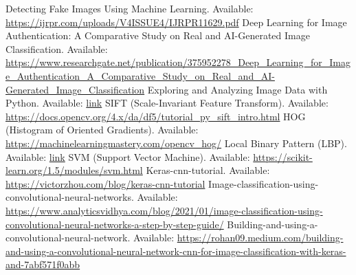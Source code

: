 \documentclass[10pt,twocolumn,letterpaper]{article}
\begin{document}
\begin{thebibliography}{6}
     Detecting Fake Images Using Machine Learning. Available: \url{https://ijrpr.com/uploads/V4ISSUE4/IJRPR11629.pdf}
     Deep Learning for Image Authentication: A Comparative Study on Real and AI-Generated Image Classification. Available: \url{https://www.researchgate.net/publication/375952278_Deep_Learning_for_Image_Authentication_A_Comparative_Study_on_Real_and_AI-Generated_Image_Classification}
     Exploring and Analyzing Image Data with Python. Available: \href{https://medium.com/@sehjadkhoja0/title-exploring-and-analyzing-image-data-with-python-79a7f72f4d2b}{link}
     SIFT (Scale-Invariant Feature Transform). Available: \url{https://docs.opencv.org/4.x/da/df5/tutorial_py_sift_intro.html}
     HOG (Histogram of Oriented Gradients). Available: \url{https://machinelearningmastery.com/opencv_hog/}
     Local Binary Pattern (LBP). Available: \href{https://aihalapathirana.medium.com/understanding-the-local-binary-pattern-lbp-a-powerful-method-for-texture-analysis-in-computer-4fb55b3ed8b8}{link}
     SVM (Support Vector Machine). Available: \url{https://scikit-learn.org/1.5/modules/svm.html}
     Keras-cnn-tutorial. Available: \url{https://victorzhou.com/blog/keras-cnn-tutorial}
     Image-classification-using-convolutional-neural-networks. Available: \url{https://www.analyticsvidhya.com/blog/2021/01/image-classification-using-convolutional-neural-networks-a-step-by-step-guide/}
     Building-and-using-a-convolutional-neural-network. Available: \url{https://rohan09.medium.com/building-and-using-a-convolutional-neural-network-cnn-for-image-classification-with-keras-and-7abf571f0abb}
\end{thebibliography}
    
\end{document}
